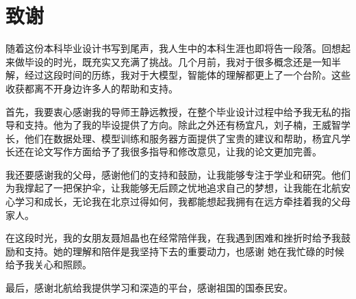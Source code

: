 \chapter*{致谢}

随着这份本科毕业设计书写到尾声，我人生中的本科生涯也即将告一段落。回想起来做毕设的时光，既充实又充满了挑战。几个月前，我对于很多概念还是一知半解，经过这段时间的历练，我对于大模型，智能体的理解都更上了一个台阶。这些收获都离不开身边许多人的帮助和支持。

首先，我要衷心感谢我的导师王静远教授，在整个毕业设计过程中给予我无私的指导和支持。他为了我的毕设提供了方向。除此之外还有杨宜凡，刘子楠，王威智学长，他们在数据处理、模型训练和服务器方面提供了宝贵的建议和帮助，杨宜凡学长还在论文写作方面给予了我很多指导和修改意见，让我的论文更加完善。

我还要感谢我的父母，感谢他们的支持和鼓励，让我能够专注于学业和研究。他们为我撑起了一把保护伞，让我能够无后顾之忧地追求自己的梦想，让我能在北航安心学习和成长，无论我在北京过得如何，我都能想起我拥有在远方牵挂着我的父母家人。

在这段时光，我的女朋友聂旭晶也在经常陪伴我，在我遇到困难和挫折时给予我鼓励和支持。她的理解和陪伴是我坚持下去的重要动力，也感谢 她在我忙碌的时候给予我关心和照顾。

最后，感谢北航给我提供学习和深造的平台，感谢祖国的国泰民安。


\cleardoublepage
